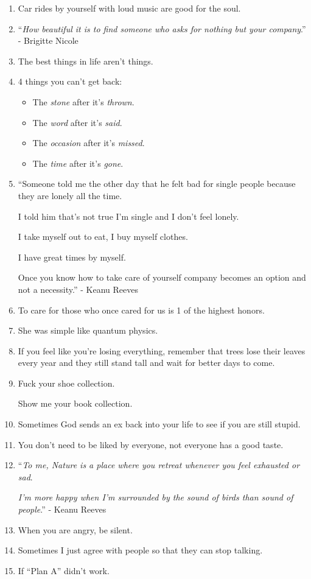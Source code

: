 \documentclass{article}
\numberwithin{equation}{section}
\begin{document}
\begin{enumerate}
    Otherwise, you'll run out of time.
    \item Car rides by yourself with loud music are good for the soul.
    \item ``\textit{How beautiful it is to find someone who asks for nothing but your company}.'' - Brigitte Nicole
    \item The best things in life aren't things.
    \item 4 things you can't get back:
    \begin{itemize}
        \item The \textit{stone} after it's \textit{thrown}.
        \item The \textit{word} after it's \textit{said}.
        \item The \textit{occasion} after it's \textit{missed}.
        \item The \textit{time} after it's \textit{gone}.
    \end{itemize}
    \item ``Someone told me the other day that he felt bad for single people because they are lonely all the time.
    
    I told him that's not true I'm single and I don't feel lonely.
    
    I take myself out to eat, I buy myself clothes.
    
    I have great times by myself.
    
    Once you know how to take care of yourself company becomes an option and not a necessity.'' - Keanu Reeves
    \item To care for those who once cared for us is 1 of the highest honors.
    \item She was simple like quantum physics.
    \item If you feel like you're losing everything, remember that trees lose their leaves every year and they still stand tall and wait for better days to come.
    \item Fuck your shoe collection.
    
    Show me your book collection.
    \item Sometimes God sends an ex back into your life to see if you are still stupid.
    \item You don't need to be liked by everyone, not everyone has a good taste.
    \item ``\textit{To me, Nature is a place where you retreat whenever you feel exhausted or sad}.
    
    \textit{I'm more happy when I'm surrounded by the sound of birds than sound of people}.'' - Keanu Reeves
    \item When you are angry, be silent.
    \item Sometimes I just agree with people so that they can stop talking.
    \item If ``Plan A'' didn't work.
    

\end{enumerate}
\end{document}
